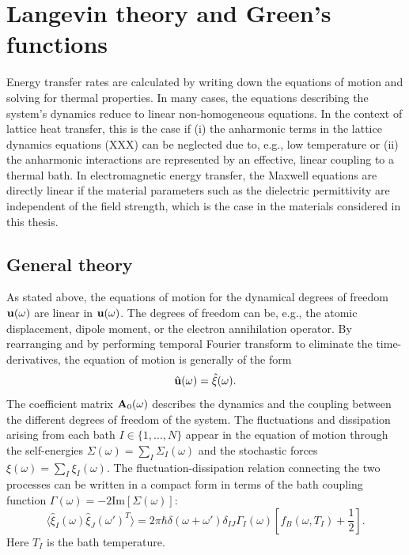 \section{Langevin theory and Green's functions}

Energy transfer rates are calculated by writing down the equations of motion and solving for thermal properties. In many cases, the equations describing the system's dynamics reduce to linear non-homogeneous equations. In the context of lattice heat transfer, this is the case if (i) the anharmonic terms in the lattice dynamics equations (XXX) can be neglected due to, e.g., low temperature or (ii) the anharmonic interactions are represented by an effective, linear coupling to a thermal bath. In electromagnetic energy transfer, the Maxwell equations are directly linear if the material parameters such as the dielectric permittivity are independent of the field strength, which is the case in the materials considered in this thesis. 

\subsection{General theory}

As stated above, the equations of motion for the dynamical degrees of freedom $\mathbf{u}(\omega)$ are linear in $\mathbf{u}(\omega)$. The degrees of freedom can be, e.g., the atomic displacement, dipole moment, or the electron annihilation operator. By rearranging and by performing temporal Fourier transform to eliminate the time-derivatives, the equation of motion is generally of the form
\begin{equation}
 [\bb{A}_0+\Sigma(\omega)] \hat\bu(\omega) =  \hat \xi(\omega).
\end{equation}
The coefficient matrix $\mathbf{A}_0(\omega)$ describes the dynamics and the coupling between the different degrees of freedom of the system. The fluctuations and dissipation arising from each bath $I\in \{1,\dots,N\}$ appear in the equation of motion through the self-energies $\Sigma(\omega)=\sum_I \Sigma_I(\omega)$ and the stochastic forces $\xi(\omega)=\sum_I \xi_I(\omega)$. The fluctuation-dissipation relation connecting the two processes can be written in a compact form in terms of the bath coupling function $\Gamma(\omega)=-2\textrm{Im}[\Sigma(\omega)]$:
\begin{equation}
 \langle \hat \xi_I(\omega)\hat \xi_J(\omega')^T \rangle = 2\pi \hbar \delta(\omega+\omega')\delta_{IJ} \Gamma_I(\omega) \left[f_B(\omega,T_I)+\frac{1}{2} \right].
\end{equation}
Here $T_I$ is the bath temperature.

